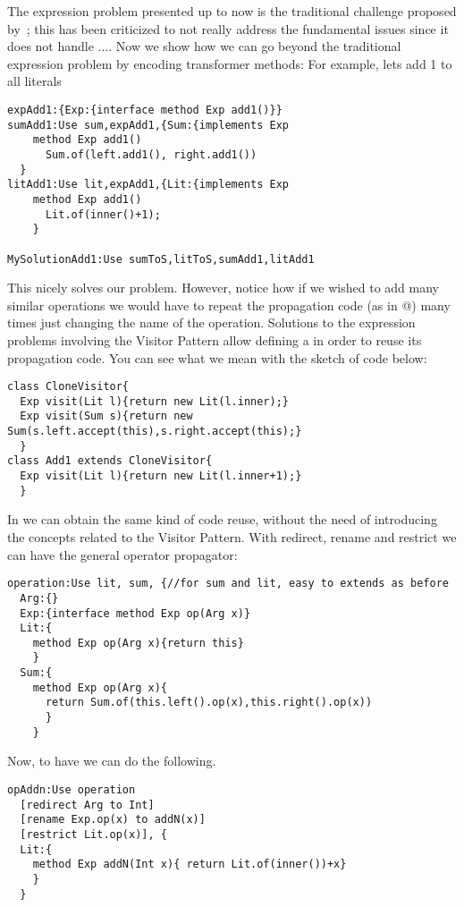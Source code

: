 The expression problem presented up to now is the traditional challenge proposed by~\cite{wadler1998expression};
this has been criticized to not really address the fundamental issues since it does not handle ....
Now we show how we can go beyond the traditional expression problem by encoding transformer methods:
For example, lets add 1 to all literals
\begin{lstlisting}
expAdd1:{Exp:{interface method Exp add1()}}
sumAdd1:Use sum,expAdd1,{Sum:{implements Exp
    method Exp add1()
      Sum.of(left.add1(), right.add1())
  }
litAdd1:Use lit,expAdd1,{Lit:{implements Exp
    method Exp add1()
      Lit.of(inner()+1);
    }

MySolutionAdd1:Use sumToS,litToS,sumAdd1,litAdd1
\end{lstlisting}

This nicely solves our problem. 
However, notice how if we wished to add many similar operations we would 
have to repeat the propagation code (as in @) many times
just changing the name of the operation.
Solutions to the expression problems involving the  Visitor Pattern 
allow defining a \Q@CloneVisitor@ in order
to reuse its propagation code.
You can see what we mean with the sketch of code below:
\begin{lstlisting}
class CloneVisitor{
  Exp visit(Lit l){return new Lit(l.inner);}
  Exp visit(Sum s){return new Sum(s.left.accept(this),s.right.accept(this);}
  }
class Add1 extends CloneVisitor{
  Exp visit(Lit l){return new Lit(l.inner+1);}
  }
\end{lstlisting}
In \name we can obtain the same kind of code reuse, without the need of introducing 
the concepts related to the Visitor Pattern.
With redirect, rename and restrict we can have the general operator propagator:
\begin{lstlisting}
operation:Use lit, sum, {//for sum and lit, easy to extends as before
  Arg:{}
  Exp:{interface method Exp op(Arg x)}
  Lit:{
    method Exp op(Arg x){return this}
    }
  Sum:{
    method Exp op(Arg x){
      return Sum.of(this.left().op(x),this.right().op(x))
      }
    }
\end{lstlisting}

Now, to have \Q@addN@ we can do the following.

\begin{lstlisting}
opAddn:Use operation
  [redirect Arg to Int]
  [rename Exp.op(x) to addN(x)]
  [restrict Lit.op(x)], {
  Lit:{
    method Exp addN(Int x){ return Lit.of(inner())+x}
    }
  }
\end{lstlisting}  



